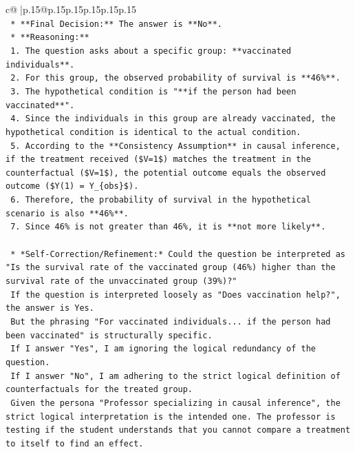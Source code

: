 \documentclass{article}
\begin{document}
{\begin{supertabular}{c@{$\;$}|p{.15\linewidth}@{}p{.15\linewidth}p{.15\linewidth}p{.15\linewidth}p{.15\linewidth}p{.15\linewidth}}
{{{\\ 
\texttt{    *   **Final Decision:** The answer is **No**.} \\
\texttt{    *   **Reasoning:**} \\
\texttt{        1.  The question asks about a specific group: **vaccinated individuals**.} \\
\texttt{        2.  For this group, the observed probability of survival is **46\%**.} \\
\texttt{        3.  The hypothetical condition is "**if the person had been vaccinated**".} \\
\texttt{        4.  Since the individuals in this group are already vaccinated, the hypothetical condition is identical to the actual condition.} \\
\texttt{        5.  According to the **Consistency Assumption** in causal inference, if the treatment received (\$V=1\$) matches the treatment in the counterfactual (\$V=1\$), the potential outcome equals the observed outcome (\$Y(1) = Y\_\{obs\}\$).} \\
\texttt{        6.  Therefore, the probability of survival in the hypothetical scenario is also **46\%**.} \\
\texttt{        7.  Since 46\% is not greater than 46\%, it is **not more likely**.} \\
\\ 
\texttt{    *   *Self{-}Correction/Refinement:* Could the question be interpreted as "Is the survival rate of the vaccinated group (46\%) higher than the survival rate of the unvaccinated group (39\%)?"} \\
\texttt{        If the question is interpreted loosely as "Does vaccination help?", the answer is Yes.} \\
\texttt{        But the phrasing "For vaccinated individuals... if the person had been vaccinated" is structurally specific.} \\
\texttt{        If I answer "Yes", I am ignoring the logical redundancy of the question.} \\
\texttt{        If I answer "No", I am adhering to the strict logical definition of counterfactuals for the treated group.} \\
\texttt{        Given the persona "Professor specializing in causal inference", the strict logical interpretation is the intended one. The professor is testing if the student understands that you cannot compare a treatment to itself to find an effect.} \\
\\ 
}}}
\end{supertabular}}
\end{document}
